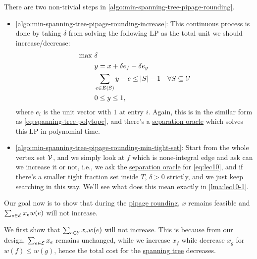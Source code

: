 \begin{remark}
	There are two non-trivial steps in \autoref{algo:min-spanning-tree-pipage-rounding}.
	\begin{itemize}
		\item \autoref{algo:min-spanning-tree-pipage-rounding-increase}: This continuous process is done by taking \(\delta \) from solving the following LP as the total unit we should increase/decrease:
		      \begin{equation}\label{eq:lec10}
			      \begin{aligned}
				      \max~ & \delta                                                                                                    \\
				            & y = x+\delta e_f - \delta e_g                                                                             \\
				            & \sum_{e\in E(S)} y- e \leq \left\vert S \right\vert - 1 & \forall S \subseteq \mathcal{\MakeUppercase{v}} \\
				            & 0 \leq y \leq 1,
			      \end{aligned}
		      \end{equation}
		      where \(e_i\) is the unit vector with \(1\) at entry \(i\). Again, this is in the similar form as \autoref{eq:spanning-tree-polytope}, and there's a \hyperref[rmk:separation-oracle]{separation oracle} which solves this LP in polynomial-time.
		\item \autoref{algo:min-spanning-tree-pipage-rounding-min-tight-set}: Start from the whole vertex set \(\mathcal{\MakeUppercase{v}} \), and we simply look at \(f\) which is none-integral edge and ask can we increase it or not, i.e., we ask the \hyperref[rmk:separation-oracle]{separation oracle} for \autoref{eq:lec10}, and if there's a smaller \hyperref[not:tight]{tight} fraction set inside \(T\), \(\delta > 0\) strictly, and we just keep searching in this way. We'll see what does this mean exactly in \autoref{lma:lec10-1}.
	\end{itemize}
\end{remark}

Our goal now is to show that during the \hyperref[algo:min-spanning-tree-pipage-rounding]{pipage rounding}, \(x\) remains feasible and \(\sum_{e\in \mathcal{\MakeUppercase{e}} } x_e w(e)\) will not increase.

We first show that \(\sum_{e\in \mathcal{\MakeUppercase{e}} } x_e w(e)\) will not increase. This is because from our design, \(\sum_{e\in \mathcal{\MakeUppercase{e}} }x_e \) remains unchanged, while we increase \(x_f\) while decrease \(x_g\) for \(w(f) \leq w(g)\), hence the total cost for the \hyperref[def:spanning-tree]{spanning tree} decreases.

